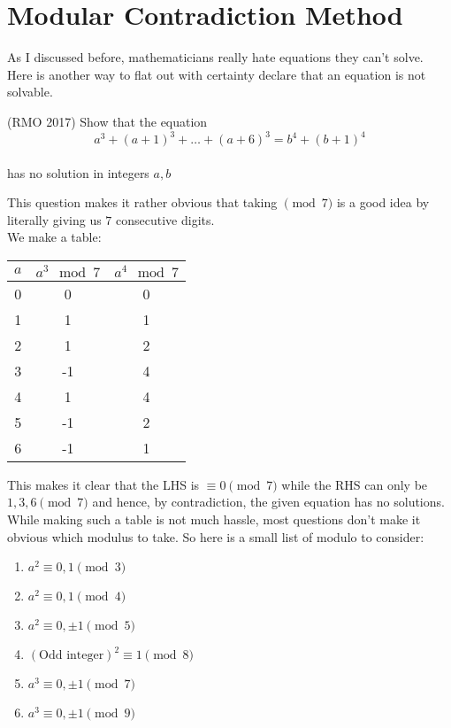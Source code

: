 \section{Modular Contradiction Method}
As I discussed before, mathematicians really hate equations they can't solve.\\
Here is another way to flat out with certainty declare that an equation is not solvable.\\
\begin{example}
(RMO 2017)
Show that the equation\\
    \[a^3 + (a + 1)^3 + \dots + (a + 6)^3 = b^4 + (b + 1)^4\]\\
has no solution in integers $a,b$
\end{example}
This question makes it rather obvious that taking $\pmod{7}$ is a good idea by literally giving us $7$ consecutive digits.\\
We make a table:\\
\begin{table}[h]
    \centering
    \begin{tabular}{|c|c|c|}
        \hline
        \(a\) & \(a^3 \mod 7\) & \(a^4 \mod 7\) \\
        \hline
        0 & 0 & 0 \\
        1 & 1 & 1 \\
        2 & 1 & 2 \\
        3 & -1 & 4 \\
        4 & 1 & 4 \\
        5 & -1 & 2 \\
        6 & -1 & 1 \\
        \hline
    \end{tabular}
\end{table}
This makes it clear that the LHS is $\equiv 0 \pmod{7}$ while the RHS can only be $1,3,6 \pmod{7}$ and hence, by contradiction, the given equation has no solutions.\\
While making such a table is not much hassle, most questions don't make it obvious which modulus to take. So here is a small list of modulo to consider:\\
\begin{theorem}
\begin{enumerate}
    \item $a^2 \equiv 0,1 \pmod{3}$
    \item  $a^2 \equiv 0,1 \pmod{4}$
    \item  $a^2 \equiv 0,\pm 1 \pmod{5}$
    \item $(\text{Odd integer})^2 \equiv 1 \pmod{8}$
    \item  $a^3 \equiv 0,\pm 1 \pmod{7}$
    \item  $a^3 \equiv 0,\pm 1 \pmod{9}$
\end{enumerate}
\end{theorem}
